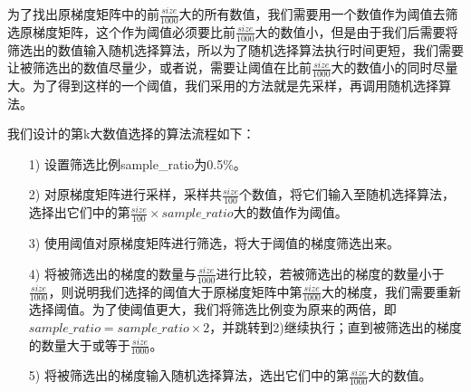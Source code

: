 为了找出原梯度矩阵中的前$\frac{size}{1000}$大的所有数值，我们需要用一个数值作为阈值去筛选原梯度矩阵，这个作为阈值必须要比前$\frac{size}{1000}$大的数值小，但是由于我们后需要将筛选出的数值输入随机选择算法，所以为了随机选择算法执行时间更短，我们需要让被筛选出的数值尽量少，或者说，需要让阈值在比前$\frac{size}{1000}$大的数值小的同时尽量大。为了得到这样的一个阈值，我们采用的方法就是先采样，再调用随机选择算法。

我们设计的第k大数值选择的算法流程如下：
\begin{itemize}
  \item [1)]
  设置筛选比例sample\_ratio为0.5\%。
  \item [2)]
  对原梯度矩阵进行采样，采样共$\frac{size}{100}$个数值，将它们输入至随机选择算法，选择出它们中的第$\frac{size}{100}\times sample\_ratio$大的数值作为阈值。
  \item [3)]
  使用阈值对原梯度矩阵进行筛选，将大于阈值的梯度筛选出来。
  \item [4)]
  将被筛选出的梯度的数量与$\frac{size}{1000}$进行比较，若被筛选出的梯度的数量小于$\frac{size}{1000}$，则说明我们选择的阈值大于原梯度矩阵中第$\frac{size}{1000}$大的梯度，我们需要重新选择阈值。为了使阈值更大，我们将筛选比例变为原来的两倍，即$sample\_ratio = sample\_ratio \times 2$，并跳转到2)继续执行；直到被筛选出的梯度的数量大于或等于$\frac{size}{1000}$。
  \item [5)]
  将被筛选出的梯度输入随机选择算法，选出它们中的第$\frac{size}{1000}$大的数值。
\end{itemize}